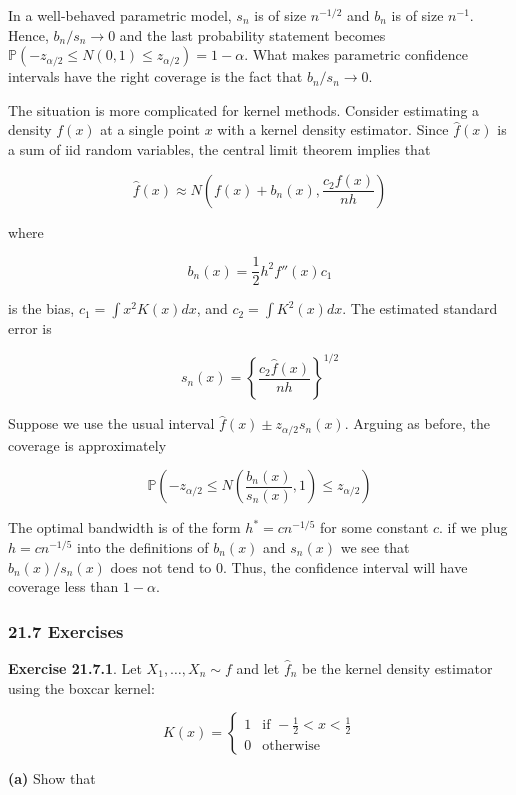 In a well-behaved parametric model, \(s_n\) is of size \(n^{-1/2}\) and
\(b_n\) is of size \(n^{-1}\). Hence, \(b_n / s_n \rightarrow 0\) and
the last probability statement becomes
\(\mathbb{P}\left(- z_{\alpha / 2} \leq N\left(0, 1\right) \leq z_{\alpha / 2}\right) = 1 - \alpha\).
What makes parametric confidence intervals have the right coverage is
the fact that \(b_n / s_n \rightarrow 0\).

The situation is more complicated for kernel methods. Consider
estimating a density \(f(x)\) at a single point \(x\) with a kernel
density estimator. Since \(\hat{f}(x)\) is a sum of iid random
variables, the central limit theorem implies that

\[ \hat{f}(x) \approx N \left( f(x) + b_n(x), \frac{c_2 f(x)}{nh} \right) \]

where

\[ b_n(x) = \frac{1}{2} h^2 f''(x) c_1 \]

is the bias, \(c_1 = \int x^2 K(x) dx\), and \(c_2 = \int K^2(x) dx\).
The estimated standard error is

\[ s_n(x) = \left\{ \frac{c_2 \hat{f}(x)}{nh} \right\}^{1/2} \]

Suppose we use the usual interval
\(\hat{f}(x) \pm z_{\alpha/2} s_n(x)\). Arguing as before, the coverage
is approximately

\[ \mathbb{P}\left(-z_{\alpha/2} \leq N\left(\frac{b_n(x)}{s_n(x)}, 1\right) \leq z_{\alpha/2} \right) \]

The optimal bandwidth is of the form \(h^* = cn^{-1/5}\) for some
constant \(c\). if we plug \(h = cn^{-1/5}\) into the definitions of
\(b_n(x)\) and \(s_n(x)\) we see that \(b_n(x) / s_n(x)\) does not tend
to 0. Thus, the confidence interval will have coverage less than
\(1 - \alpha\).

\subsubsection{21.7 Exercises}\label{exercises}

\textbf{Exercise 21.7.1}. Let \(X_1, \dots, X_n \sim f\) and let
\(\hat{f}_n\) be the kernel density estimator using the boxcar kernel:

\[ K(x) = \begin{cases}
1 & \text{if } -\frac{1}{2} < x < \frac{1}{2} \\
0 & \text{otherwise}
\end{cases}\]

\textbf{(a)} Show that

